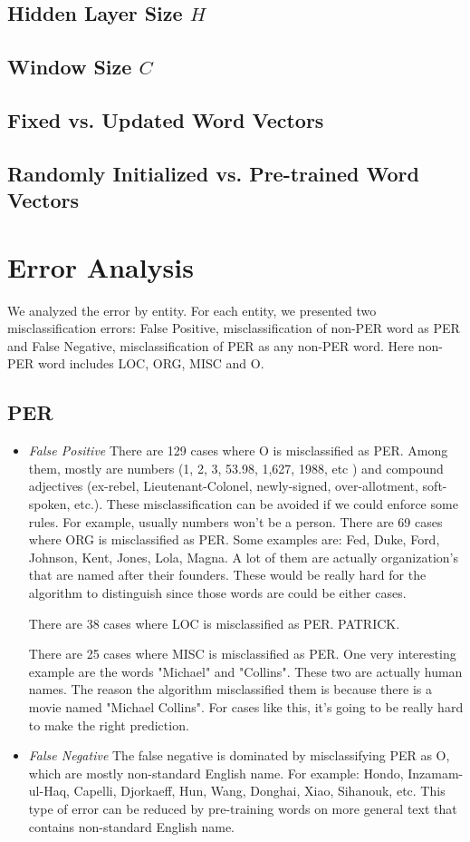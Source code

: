 \documentclass[11pt, oneside]{article}   	%
\begin{document}
\subsection{Hidden Layer Size $H$}
\subsection{Window Size $C$}
\subsection{Fixed vs. Updated Word Vectors}
\subsection{Randomly Initialized vs. Pre-trained Word Vectors}


\section{Error Analysis}

We analyzed the error by entity. For each entity, we presented two misclassification errors: False Positive, misclassification of non-PER word as PER and False Negative, misclassification of PER as any non-PER word. Here non-PER word includes LOC, ORG, MISC and O. 


\subsection{PER}
\begin{itemize}
\item \emph{False Positive}
There are 129 cases where O is misclassified as PER. Among them, mostly are numbers (1, 2, 3, 53.98, 1,627, 1988, etc ) and compound adjectives (ex-rebel, Lieutenant-Colonel, newly-signed, over-allotment, soft-spoken, etc.). These misclassification can be avoided if we could enforce some rules. For example, usually numbers won't be a person.
There are 69 cases where ORG is misclassified as PER. Some examples are: Fed, Duke, Ford, Johnson, Kent, Jones, Lola, Magna. A lot of them are actually organization's that are named after their founders. These would be really hard for the algorithm to distinguish since those words are could be either cases. 


There are 38 cases where LOC is misclassified as PER. PATRICK. 

There are 25 cases where MISC is misclassified as PER. One very interesting example are the words "Michael" and "Collins". These two are actually human names. The reason the algorithm misclassified them is because there is a movie named "Michael Collins". For cases like this, it's going to be really hard to make the right prediction. 


\item \emph{False Negative}
The false negative is dominated by misclassifying PER as O, which are mostly non-standard English name. For example: Hondo, Inzamam-ul-Haq, Capelli, Djorkaeff, Hun, Wang, Donghai, Xiao, Sihanouk, etc. This type of error can be reduced by pre-training words on more general text that contains non-standard English name.

\end{itemize}
\end{document}
